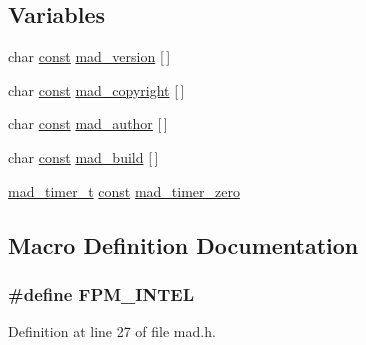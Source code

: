 \subsection*{Variables}
\begin{DoxyCompactItemize}
\item 
char \hyperlink{getopt1_8c_a2c212835823e3c54a8ab6d95c652660e}{const} \hyperlink{lib-src_2libmad_2msvc_09_09_2mad_8h_a591cc8ef08e7a4aa760dd39c3b2ac6fd}{mad\+\_\+version} \mbox{[}$\,$\mbox{]}
\item 
char \hyperlink{getopt1_8c_a2c212835823e3c54a8ab6d95c652660e}{const} \hyperlink{lib-src_2libmad_2msvc_09_09_2mad_8h_a96d0c229655b816cb04a849560ceb61d}{mad\+\_\+copyright} \mbox{[}$\,$\mbox{]}
\item 
char \hyperlink{getopt1_8c_a2c212835823e3c54a8ab6d95c652660e}{const} \hyperlink{lib-src_2libmad_2msvc_09_09_2mad_8h_a91fd9056faedd006c829818a4865c93c}{mad\+\_\+author} \mbox{[}$\,$\mbox{]}
\item 
char \hyperlink{getopt1_8c_a2c212835823e3c54a8ab6d95c652660e}{const} \hyperlink{lib-src_2libmad_2msvc_09_09_2mad_8h_a11104a46f15ac68091f712bda8e0673a}{mad\+\_\+build} \mbox{[}$\,$\mbox{]}
\item 
\hyperlink{structmad__timer__t}{mad\+\_\+timer\+\_\+t} \hyperlink{getopt1_8c_a2c212835823e3c54a8ab6d95c652660e}{const} \hyperlink{lib-src_2libmad_2msvc_09_09_2mad_8h_a99b7db3d65e6508fc9952f421c08e6a6}{mad\+\_\+timer\+\_\+zero}
\end{DoxyCompactItemize}


\subsection{Macro Definition Documentation}
\subsubsection[{\texorpdfstring{F\+P\+M\+\_\+\+I\+N\+T\+EL}{FPM_INTEL}}]{\setlength{\rightskip}{0pt plus 5cm}\#define F\+P\+M\+\_\+\+I\+N\+T\+EL}\hypertarget{lib-src_2libmad_2msvc_09_09_2mad_8h_ac451994561cb3d439255059cff259057}{}\label{lib-src_2libmad_2msvc_09_09_2mad_8h_ac451994561cb3d439255059cff259057}


Definition at line 27 of file mad.\+h.

